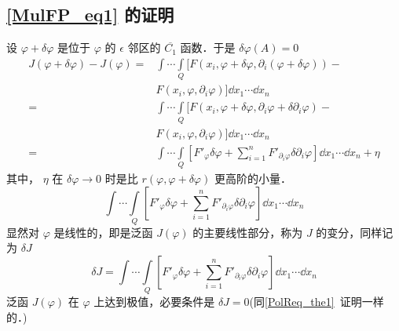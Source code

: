 \subsection{\autoref{MulFP_eq1} 的证明}
设 $\varphi+\delta\varphi$ 是位于 $\varphi$ 的 $\epsilon$ 邻区的 $\overline{C_1}$ 函数．于是 $\delta{\varphi}(A)=0$
\begin{equation}
\begin{aligned}
J(\varphi+\delta\varphi)-J(\varphi)=&\int\cdots\int\limits_Q [F(x_i,\varphi+\delta\varphi,\partial_i(\varphi+\delta\varphi))-\\
&F(x_i,\varphi,\partial_i\varphi)]\dd x_1\cdots\dd x_n\\
=&\int\cdots\int\limits_Q [F(x_i,\varphi+\delta\varphi,\partial_i\varphi+\delta\partial_i\varphi)-\\
&F(x_i,\varphi,\partial_i\varphi)]\dd x_1\cdots\dd x_n\\
=&\int\cdots\int\limits_Q [F'_\varphi\delta\varphi+\sum_{i=1}^nF'_{\partial_i\varphi}\delta\partial_i\varphi]\dd x_1\cdots\dd x_n+\eta
\end{aligned}
\end{equation}
其中， $\eta$ 在 $\delta\varphi\rightarrow0$ 时是比 $r(\varphi,\varphi+\delta\varphi)$ 更高阶的小量．
\begin{equation}
\int\cdots\int\limits_Q [F'_\varphi\delta\varphi+\sum_{i=1}^nF'_{\partial_i\varphi}\delta\partial_i\varphi]\dd x_1\cdots\dd x_n
\end{equation}
显然对 $\varphi$ 是线性的，即是泛函 $J(\varphi)$ 的主要线性部分，称为 $J$ 的变分，同样记为 $\delta J$
\begin{equation}
\delta J=\int\cdots\int\limits_Q [F'_\varphi\delta\varphi+\sum_{i=1}^nF'_{\partial_i\varphi}\delta\partial_i\varphi]\dd x_1\cdots\dd x_n
\end{equation}
泛函 $J(\varphi)$ 在 $\varphi$ 上达到极值，必要条件是 $\delta J=0$(同\autoref{PolReq_the1}~证明一样的．)